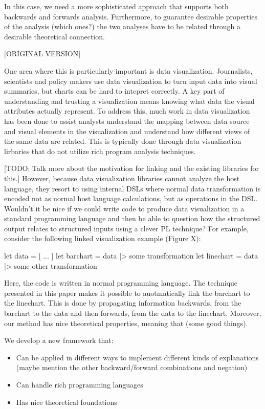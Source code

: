 In this case, we need a more sophisticated approach that supports both backwards and forwards analysis. Furthermore, to guarantee desirable properties of the analysis (which ones?) the two analyses have to be related through a desirable theoretical connection. 

[ORIGINAL VERSION]

One area where this is particularly important is data visualization. Journalists, scientists and policy makers use data visualization to turn input data into visual summaries, but charts can be hard to intepret correctly. A key part of understanding and trusting a visualization means knowing what data the visual attributes actually represent. To address this, much work in data visualization has been done to assist analysts understand the mapping between data source and visual elements in the visualization and understand how different views of the same data are related. This is typically done through data visualization lirbaries that do not utilize rich program analysis techniques.

[TODO: Talk more about the motivation for linking and the existing libraries for this.]
However, because data visualization libraries cannot analyze the host language, they resort to using internal DSLs where normal data transformation is encoded not as normal host language calculations, but as operations in the DSL. Wouldn't it be nice if we could write code to produce data visualization in a standard programming language and then be able to question how the structured output relates to structured inputs using a clever PL technique? For example, consider the following linked visualization example (Figure X):

let data = [ ... ]
let barchart = data |> some transformation
let linechart = data |> some other transformation

Here, the code is written in normal programming language. The technique presented in this paper makes it possible to auotmatically link the barchart to the linechart. This is done by propagating information backwards, from the barchart to the data and then forwards, from the data to the linechart. Moreover, our method has nice theoretical properties, meaning that (some good things).

We develop a new framework that:

\begin{itemize}
\item Can be applied in different ways to implement different kinds of explanations (maybe mention the other backward/forward combinations and negation)
\item Can handle rich programming languages
\item Has nice theoretical foundations
\end{itemize}




